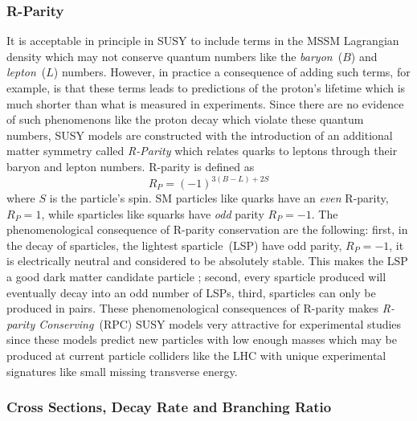 \subsubsection{R-Parity}
It is acceptable in principle in SUSY to include terms in the MSSM Lagrangian density which may not conserve quantum numbers like the \textit{baryon}~($B$) and \textit{lepton}~($L$) numbers. However, in practice a consequence of adding such terms, for example, is that these terms leads to predictions of the proton's lifetime which is much shorter than what is measured in experiments. Since there are no evidence of such phenomenons like the proton decay which violate these quantum numbers, SUSY models are constructed with the introduction of an additional matter symmetry called \textit{R-Parity} which relates quarks to leptons through their baryon and lepton numbers. R-parity is defined as
\begin{equation}
R_{P} = \left(-1\right)^{3(B-L) + 2S}
\end{equation}
where $S$ is the particle's spin.
SM particles like quarks have an \textit{even} R-parity, $R_{P} = 1$, while sparticles like squarks have \textit{odd} parity $R_{P} = -1$.
\newline
The phenomenological consequence of R-parity conservation are the following: first, in the decay of sparticles, the lightest sparticle~(LSP) have odd parity, $R_{P} =-1$, it is electrically neutral and considered to be absolutely stable. This makes the LSP a good dark matter candidate particle \cite{SUSYDM,KOlive}; second, every sparticle produced will eventually decay into an odd number of LSPs, third, sparticles can only be produced in pairs.
These phenomenological consequences of R-parity makes \textit{R-parity Conserving}~(RPC) SUSY models very attractive for experimental studies since these models predict new particles with low enough masses which may be produced at current particle colliders like the LHC with unique experimental signatures like small missing transverse energy.

\subsubsection{Cross Sections, Decay Rate and Branching Ratio}\label{LHCSUSY}
